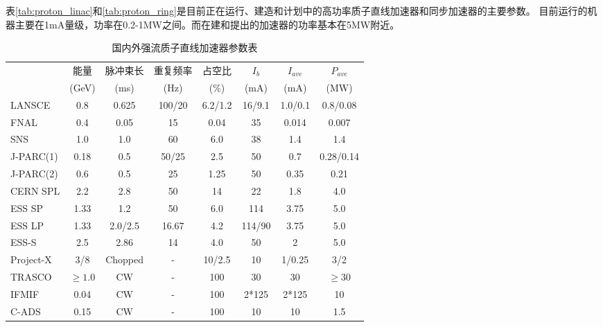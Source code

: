 表\eqref{tab:proton_linac}和\eqref{tab:proton_ring}是目前正在运行、建造和计划中的高功率质子直线加速器和同步加速器的主要参数\cite{tang2011proton}。
目前运行的机器主要在1mA量级，功率在0.2-1MW之间。而在建和提出的加速器的功率基本在5MW附近。

\begin{table}[!htb]
  \centering
  \caption{国内外强流质子直线加速器参数表}
  \begin{tabular}{|>{\small}l|c|c|c|c|c|c|c|}
    \hline
                &能量      &脉冲束长   &重复频率        &占空比       &$I_{b}$   &$I_{ave}$ &$P_{ave}$ \\
                &(GeV)  &(ms)  &(Hz)        &(\%)     &(mA)      &(mA)      &(MW)      \\
    \hline
    LANSCE      &0.8   &0.625    &100/20    &6.2/1.2  &16/9.1    &1.0/0.1   &0.8/0.08  \\
    FNAL        &0.4   &0.05     &15        &0.04     &35        &0.014     &0.007     \\
    SNS         &1.0   &1.0      &60        &6.0      &38        &1.4       &1.4       \\
    J-PARC(1)   &0.18  &0.5      &50/25     &2.5      &50        &0.7       &0.28/0.14 \\
    J-PARC(2)   &0.6   &0.5      &25        &1.25     &50        &0.35      &0.21      \\
    CERN SPL    &2.2   &2.8      &50        &14       &22        &1.8       &4.0       \\
    ESS SP      &1.33  &1.2      &50        &6.0      &114       &3.75      &5.0       \\
    ESS LP      &1.33  &2.0/2.5  &16.67     &4.2      &114/90    &3.75      &5.0       \\
    ESS-S       &2.5   &2.86     &14        &4.0      &50        &2         &5.0       \\
    Project-X   &3/8   &Chopped  &-         &10/2.5   &10        &1/0.25    &3/2       \\
    TRASCO      &$\geqslant 1.0$ &CW  &-      &100      &30        &30        &$\geqslant 30$ \\
    IFMIF       &0.04  &CW       &-         &100      &2*125     &2*125     &10        \\
    C-ADS       &0.15  &CW       &-         &100      &10        &10        &1.5       \\
    \hline
  \end{tabular}
  \label{tab:proton_linac}
\end{table}

